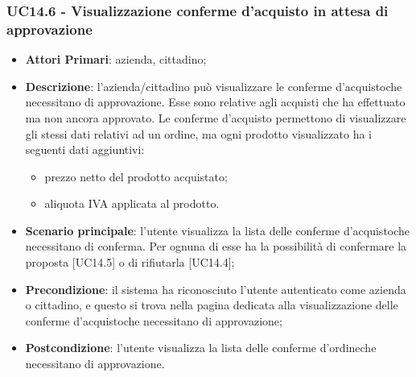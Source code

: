 \subsubsection{UC14.6 - Visualizzazione conferme d'acquisto in attesa di 
approvazione}
\begin{itemize}
	\item \textbf{Attori Primari}: azienda, cittadino;
	\item \textbf{Descrizione}: l'azienda/cittadino può visualizzare le conferme d'acquisto\glosp che necessitano di approvazione. Esse sono relative agli acquisti che ha effettuato ma non ancora approvato. Le conferme d'acquisto permettono di visualizzare gli stessi dati relativi ad un ordine, ma ogni prodotto visualizzato ha i seguenti dati aggiuntivi:
	\begin{itemize}
		\item prezzo netto del prodotto acquistato;	
		\item aliquota IVA applicata al prodotto.
	\end{itemize}
	\item \textbf{Scenario principale}: l'utente visualizza la lista delle 
	conferme d'acquisto\glosp che necessitano di conferma. Per ognuna di esse 
	ha la possibilità di confermare la proposta [UC14.5] o di rifiutarla 
	[UC14.4];

	\item \textbf{Precondizione}: il sistema ha riconosciuto l'utente autenticato come azienda o cittadino, e questo si trova nella pagina dedicata alla visualizzazione delle conferme d'acquisto\glosp che necessitano di approvazione;
	\item \textbf{Postcondizione}: l'utente visualizza la lista delle conferme d'ordine\glosp che necessitano di approvazione.
\end{itemize}





